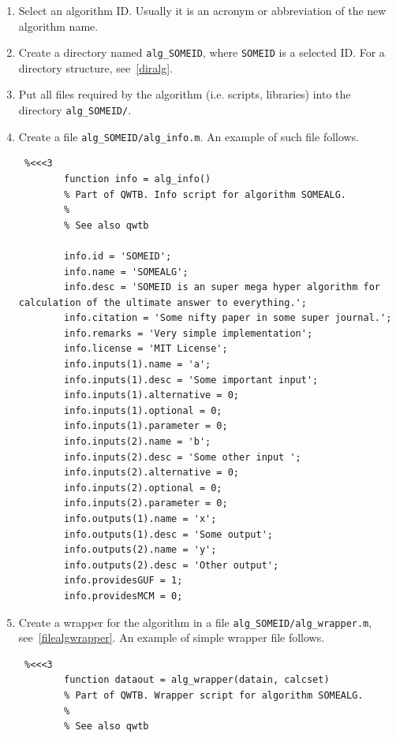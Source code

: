 \documentclass[12pt,a4paper,oneside]{report} %
\begin{document}
\begin{enumerate}
        \item Select an algorithm ID. Usually it is an acronym or abbreviation of the new algorithm name.

        \item Create a directory named {\tt alg\_SOMEID}, where {\tt SOMEID} is a selected ID. For a
        directory structure, see~\ref{diralg}.

        \item Put all files required by the algorithm (i.e. scripts, libraries) into the directory
        {\tt alg\_SOMEID/}.

        \item Create a file {\tt alg\_SOMEID/alg\_info.m}. An example of such file follows.
        \begin{lstlisting} %<<<3
        function info = alg_info() 
        % Part of QWTB. Info script for algorithm SOMEALG.
        %
        % See also qwtb

        info.id = 'SOMEID';
        info.name = 'SOMEALG';
        info.desc = 'SOMEID is an super mega hyper algorithm for calculation of the ultimate answer to everything.';
        info.citation = 'Some nifty paper in some super journal.';
        info.remarks = 'Very simple implementation';
        info.license = 'MIT License';
        info.inputs(1).name = 'a';
        info.inputs(1).desc = 'Some important input';
        info.inputs(1).alternative = 0;
        info.inputs(1).optional = 0;
        info.inputs(1).parameter = 0;
        info.inputs(2).name = 'b';
        info.inputs(2).desc = 'Some other input ';
        info.inputs(2).alternative = 0;
        info.inputs(2).optional = 0;
        info.inputs(2).parameter = 0;
        info.outputs(1).name = 'x';
        info.outputs(1).desc = 'Some output';
        info.outputs(2).name = 'y';
        info.outputs(2).desc = 'Other output';
        info.providesGUF = 1;
        info.providesMCM = 0;
        \end{lstlisting} %

        \item Create a wrapper for the algorithm in a file {\tt alg\_SOMEID/alg\_wrapper.m}, see~\ref{filealgwrapper}. An example of simple wrapper
        file follows.
        \begin{lstlisting} %<<<3
        function dataout = alg_wrapper(datain, calcset)
        % Part of QWTB. Wrapper script for algorithm SOMEALG.
        %
        % See also qwtb


\end{lstlisting}
\end{enumerate}
\end{document}
